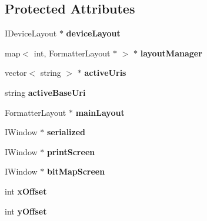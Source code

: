 \subsection*{Protected Attributes}
\begin{CompactItemize}
\item 
IDeviceLayout $\ast$ {\bf deviceLayout}\label{classbr_1_1pucrio_1_1telemidia_1_1ginga_1_1ncl_1_1multidevice_1_1FormatterMultiDevice_53f8726780eb8423c7727f8cede98b8a}

\item 
map$<$ int, FormatterLayout $\ast$ $>$ $\ast$ {\bf layoutManager}\label{classbr_1_1pucrio_1_1telemidia_1_1ginga_1_1ncl_1_1multidevice_1_1FormatterMultiDevice_42346b0a340f1bc2768a2a9b16cefdc0}

\item 
vector$<$ string $>$ $\ast$ {\bf activeUris}\label{classbr_1_1pucrio_1_1telemidia_1_1ginga_1_1ncl_1_1multidevice_1_1FormatterMultiDevice_b7e7ab426f7d8094007589979dea8ac8}

\item 
string {\bf activeBaseUri}\label{classbr_1_1pucrio_1_1telemidia_1_1ginga_1_1ncl_1_1multidevice_1_1FormatterMultiDevice_54357e691cf87d41eba764d71491d383}

\item 
FormatterLayout $\ast$ {\bf mainLayout}\label{classbr_1_1pucrio_1_1telemidia_1_1ginga_1_1ncl_1_1multidevice_1_1FormatterMultiDevice_d1423fc8d9340056736b81171d6a4ac7}

\item 
IWindow $\ast$ {\bf serialized}\label{classbr_1_1pucrio_1_1telemidia_1_1ginga_1_1ncl_1_1multidevice_1_1FormatterMultiDevice_0a8a6db72b0929c804cf0af87e761b1f}

\item 
IWindow $\ast$ {\bf printScreen}\label{classbr_1_1pucrio_1_1telemidia_1_1ginga_1_1ncl_1_1multidevice_1_1FormatterMultiDevice_6db68737fb12e7268e63aeb6fb61e708}

\item 
IWindow $\ast$ {\bf bitMapScreen}\label{classbr_1_1pucrio_1_1telemidia_1_1ginga_1_1ncl_1_1multidevice_1_1FormatterMultiDevice_8fd2aa74ef9a0766a064c1eb1b9a442e}

\item 
int {\bf xOffset}\label{classbr_1_1pucrio_1_1telemidia_1_1ginga_1_1ncl_1_1multidevice_1_1FormatterMultiDevice_38b670313be423c4fbcaa4b6ff0e5e83}

\item 
int {\bf yOffset}\label{classbr_1_1pucrio_1_1telemidia_1_1ginga_1_1ncl_1_1multidevice_1_1FormatterMultiDevice_016718268d32fcb95b1190cc1071e270}


\end{CompactItemize}
